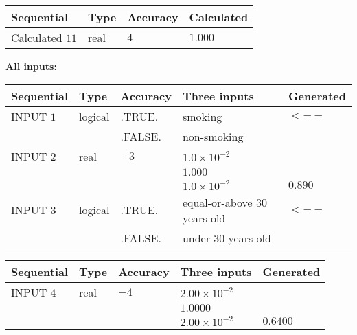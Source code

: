 \documentclass[12pt]{article}
\begin{document}
   
  
  
\noindent\begin{tabular}{|l|l|l|l|}
\hline
 Sequential & Type & Accuracy & Calculated \\ 
\hline
 
 
  Calculated $           11 $ & real & $            4  $ & 
 $ 1.000 $ 
 \\  \hline  
 \end{tabular}
   
   
   
   
\noindent\vspace{0.1in}\hspace{-0.08in} {\textbf{\Large{All inputs: }}}
   
   
  
  
\noindent\begin{tabular}{|l|l|l|l|l|}
\hline
 Sequential & Type & Accuracy & Three inputs & Generated \\ 
\hline
 
 
  INPUT $            1 $ & logical & .TRUE. & 
 smoking & 
  $ <-- $ 
  \\
  & & .FALSE. & 
  non-smoking & 
 \\  \hline  
 
 
  INPUT $            2 $ & real & $           -3  $ & $
 1.0 \times 10^{-2}
  $ & \\
  & & &  $
 1.000
  $ & \\
  & & &  $
 1.0 \times 10^{-2}
 $ & $ 0.890 $ 
 \\  \hline  
 
 
  INPUT $            3 $ & logical & .TRUE. & 
 equal-or-above 30 years old & 
  $ <-- $ 
  \\
  & & .FALSE. & 
  under 30 years old & 
 \\  \hline  
 \end{tabular}
   
   
  
  
\noindent\begin{tabular}{|l|l|l|l|l|}
\hline
 Sequential & Type & Accuracy & Three inputs & Generated \\ 
\hline
 
 
  INPUT $            4 $ & real & $           -4  $ & $
 2.00 \times 10^{-2}
  $ & \\
  & & &  $
 1.0000
  $ & \\
  & & &  $
 2.00 \times 10^{-2}
 $ & $ 0.6400 $ 
 \\  \hline  
 \end{tabular}
   
\end{document}
